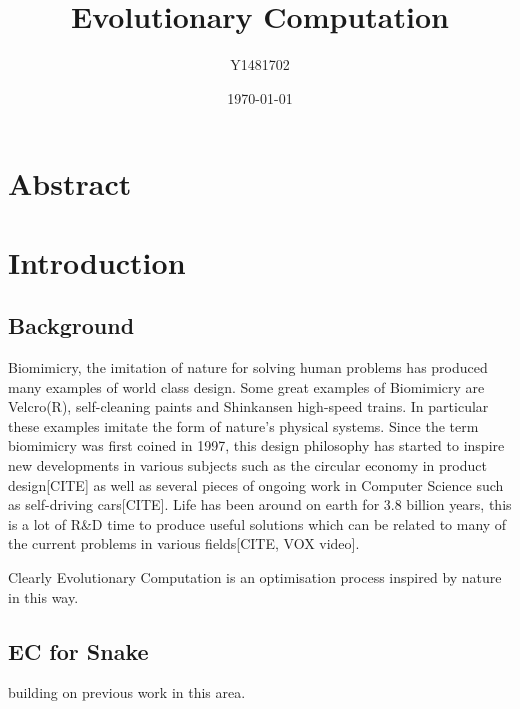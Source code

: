 \documentclass{article}
\title{Evolutionary Computation}
\author{Y1481702}
\date{\today}
\begin{document}

\begin{titlepage}
\maketitle
\tableofcontents
\end{titlepage}


\section{Abstract} %


\section{Introduction} 


\subsection{Background}
Biomimicry, the imitation of nature for solving human problems has produced many examples of world class design. 
Some great examples of Biomimicry are Velcro(R), self-cleaning paints and Shinkansen high-speed trains\cite{biomimicry}. In particular these examples imitate the form of nature's physical systems. Since the term biomimicry was first coined in 1997, this design philosophy has started to inspire new developments in various subjects such as the circular economy in product design[CITE] as well as several pieces of ongoing work in Computer Science such as self-driving cars[CITE].
Life has been around on earth for 3.8 billion years, this is a lot of R\&D time to produce useful solutions which can be related to many of the current problems in various fields[CITE, VOX video].

Clearly Evolutionary Computation is an optimisation process inspired by nature in this way.

\subsection{EC for Snake}
building on previous work in this area\cite{snake_paper, snake_blog}.
\end{document}

